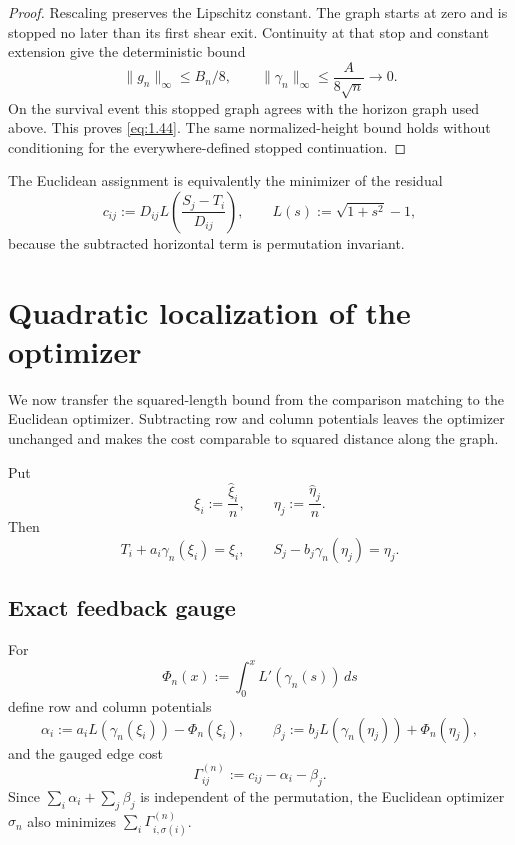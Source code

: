 \documentclass[11pt,reqno]{amsart}
\theoremstyle{definition}
\theoremstyle{remark}
\numberwithin{equation}{section}
\begin{document}
\begin{proof}
Rescaling preserves the Lipschitz constant.  The graph starts at zero and is
stopped no later than its first shear exit.  Continuity at that stop and constant
extension give the deterministic bound
\[
\|g_n\|_\infty\le B_n/8,
\qquad
\|\gamma_n\|_\infty\le\frac{A}{8\sqrt n}\longrightarrow0.
\]
On the survival event this stopped graph agrees with the horizon graph used
above.  This proves \eqref{eq:1.44}.  The same normalized-height bound holds without
conditioning for the everywhere-defined stopped continuation.
\end{proof}

The Euclidean assignment is equivalently the minimizer of the residual
\begin{equation}
c_{ij}:=D_{ij}L\!\left(\frac{S_j-T_i}{D_{ij}}\right),
\qquad
L(s):=\sqrt{1+s^2}-1,
\label{eq:1.45}
\end{equation}
because the subtracted horizontal term is permutation invariant.

\section{Quadratic localization of the optimizer}
\label{sec:localization}

We now transfer the squared-length bound from the comparison matching to
the Euclidean optimizer.  Subtracting row and column potentials leaves
the optimizer unchanged and makes the cost comparable to squared distance
along the graph.

Put
\[
\xi_i:=\frac{\widehat\xi_i}{n},\qquad
\eta_j:=\frac{\widehat\eta_j}{n}.
\]
Then
\begin{equation}
T_i+a_i\gamma_n(\xi_i)=\xi_i,\qquad
S_j-b_j\gamma_n(\eta_j)=\eta_j.
\label{eq:2.1}
\end{equation}

\subsection{Exact feedback gauge}

For
\[
\Phi_n(x):=\int_0^x L'(\gamma_n(s))\,ds
\]
define row and column potentials
\[
\alpha_i:=a_iL(\gamma_n(\xi_i))-\Phi_n(\xi_i),\qquad
\beta_j:=b_jL(\gamma_n(\eta_j))+\Phi_n(\eta_j),
\]
and the gauged edge cost
\begin{equation}
\Gamma^{(n)}_{ij}:=c_{ij}-\alpha_i-\beta_j.
\label{eq:2.2}
\end{equation}
Since \(\sum_i\alpha_i+\sum_j\beta_j\) is independent of the permutation,
the Euclidean optimizer \(\sigma_n\) also minimizes
\(\sum_i\Gamma^{(n)}_{i,\sigma(i)}\).
\end{document}
